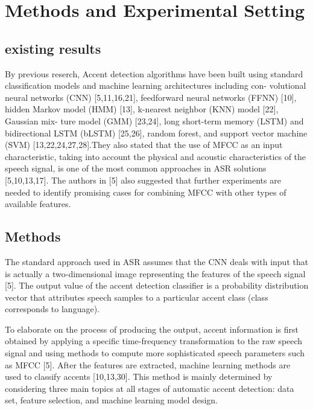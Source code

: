\documentclass[ams]{U-AizuGT}
\begin{document}
\section{Methods and Experimental Setting}

\subsection{existing results}
By previous reserch, Accent detection algorithms have been built using standard classification models and machine learning architectures including con- volutional neural networks (CNN) [5,11,16,21], feedforward neural networks (FFNN) [10], hidden Markov model (HMM) [13], k-nearest neighbor (KNN) model [22], Gaussian mix- ture model (GMM) [23,24], long short-term memory (LSTM) and bidirectional LSTM (bLSTM) [25,26], random forest, and support vector machine (SVM) [13,22,24,27,28].They also stated that the use of MFCC as an input characteristic, taking into account the physical and acoustic characteristics of the speech signal, is one of the most common approaches in ASR solutions [5,10,13,17]. The authors in [5] also suggested that further experiments are needed to identify promising cases for combining MFCC with other types of available features.

\subsection{Methods}
The standard approach used in ASR assumes that the CNN deals with input that is actually a two-dimensional image representing the features of the speech signal [5]. The output value of the accent detection classifier is a probability distribution vector that attributes speech samples to a particular accent class (class corresponds to language). \par
To elaborate on the process of producing the output, accent information is first obtained by applying a specific time-frequency transformation to the raw speech signal and using methods to compute more sophisticated speech parameters such as MFCC [5]. After the features are extracted, machine learning methods are used to classify accents [10,13,30]. This method is mainly determined by considering three main topics at all stages of automatic accent detection: data set, feature selection, and machine learning model design.
\end{document}
